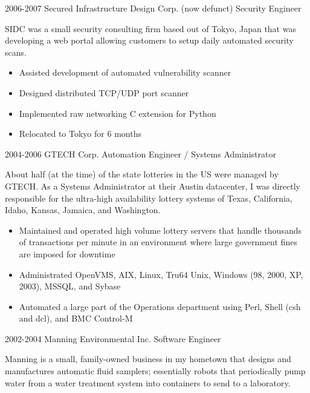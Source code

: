 \documentclass[]{friggeri-cv}
\begin{document}
\begin{entrylist}
{    }
  \entry
    {2006-2007}
    {Secured Infrastructure Design Corp. (now defunct)}
    {Security Engineer}
    {

      SIDC was a small security consulting firm based out of Tokyo,
      Japan that was developing a web portal allowing customers to
      setup daily automated security scans.\\
      
      \begin{itemize}
        \item{Assisted development of automated vulnerability scanner}
        \item{Designed distributed TCP/UDP port scanner}
        \item{Implemented raw networking C extension for Python}
        \item{Relocated to Tokyo for 6 months}
      \end{itemize}
    }
  \entry
    {2004-2006}
    {GTECH Corp.}
    {Automation Engineer / Systems Administrator}
    {

      About half (at the time) of the state lotteries in the US were
      managed by GTECH. As a Systems Administrator at their Austin
      datacenter, I was directly responsible for the ultra-high
      availability lottery systems of Texas, California, Idaho,
      Kansas, Jamaica, and Washington.\\
      
      \begin{itemize}
      \item{Maintained and operated high volume lottery servers that handle thousands of transactions per minute in an environment where large government fines are imposed for downtime}
      \item{Administrated OpenVMS, AIX, Linux, Tru64  Unix, Windows (98, 2000, XP, 2003), MSSQL, and Sybase}
      \item{Automated a large part of the Operations department using Perl, Shell (csh and dcl), and BMC Control-M}
      \end{itemize}
    }
  \entry
    {2002-2004}
    {Manning Environmental Inc.}
    {Software Engineer}
    {

      Manning is a small, family-owned business in my hometown that
      designs and manufactures automatic fluid samplers; essentially
      robots that periodically pump water from a water treatment
      system into containers to send to a laboratory.\\
      
}
\end{entrylist}
\end{document}
